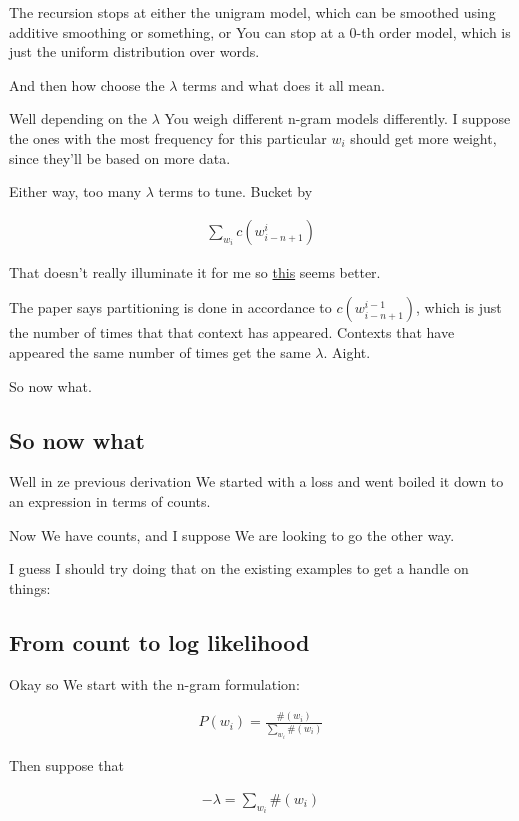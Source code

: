 \documentclass{article}
\begin{document}
	The recursion stops at either the unigram model, which can be smoothed using additive smoothing or something, or You can stop at a 0-th order model, which is just the uniform distribution over words.
	
	And then how choose the $\lambda$ terms and what does it all mean.
	
	Well depending on the $\lambda$ You weigh different n-gram models differently. I suppose the ones with the most frequency for this particular $w_i$ should get more weight, since they'll be based on more data.
	
	Either way, too many $\lambda$ terms to tune. Bucket by
	
	\begin{align}
		\sum_{w_i} c(w^i_{i-n+1})
	\end{align}
	
	That doesn't really illuminate it for me so \href{https://aclanthology.org/P96-1041.pdf}{this} seems better.
	
	The paper says partitioning is done in accordance to $c(w^{i-1}_{i-n+1})$, which is just the number of times that that context has appeared. Contexts that have appeared the same number of times get the same $\lambda$. Aight. 
	
	So now what. 
	
	\subsection{So now what}
	
		Well in ze previous derivation We started with a loss and went boiled it down to an expression in terms of counts.
		
		Now We have counts, and I suppose We are looking to go the other way. 
		
		I guess I should try doing that on the existing examples to get a handle on things:
		
	\subsection{From count to log likelihood}
	
		Okay so We start with the n-gram formulation:
		
		\begin{align}
			P(w_i) = \frac{\#(w_i)}{\sum_{w_i} \#(w_i)}
		\end{align}
		
		Then suppose that
		
		\begin{align}
			-\lambda = \sum_{w_i} \#(w_i)
		\end{align}
		
\end{document}
